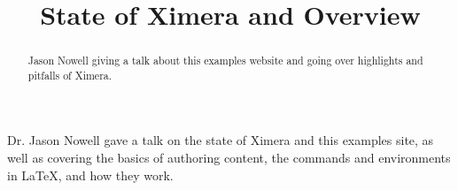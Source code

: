 \documentclass{ximera}
\title{State of Ximera and Overview}
\begin{document}
\begin{abstract}
    Jason Nowell giving a talk about this examples website and going over highlights and pitfalls of Ximera.
\end{abstract}
\maketitle

Dr. Jason Nowell gave a talk on the state of Ximera and this examples site, as well as covering the basics of authoring content, the commands and environments in LaTeX, and how they work.

\end{document}
